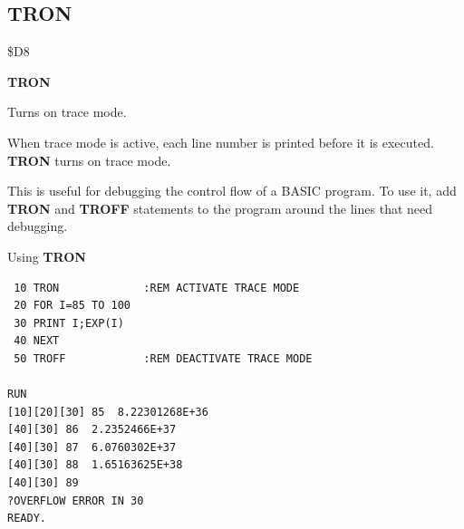 \subsection{TRON}
\begin{description}[leftmargin=2cm,style=nextline]
\item [Token:] \$D8
\item [Format:] {\bf TRON}
\item [Usage:]  Turns on trace mode.

                When trace mode is active, each line number is printed before
                it is executed. {\bf TRON} turns on trace mode.

                This is useful for debugging the control flow of a BASIC
                program. To use it, add {\bf TRON} and {\bf TROFF} statements
                to the program around the lines that need debugging.

\item [Example:] Using {\bf TRON}
\begin{tcolorbox}[colback=black,coltext=white]
\verbatimfont{\codefont}
\begin{verbatim}
 10 TRON             :REM ACTIVATE TRACE MODE
 20 FOR I=85 TO 100
 30 PRINT I;EXP(I)
 40 NEXT
 50 TROFF            :REM DEACTIVATE TRACE MODE

RUN
[10][20][30] 85  8.22301268E+36
[40][30] 86  2.2352466E+37
[40][30] 87  6.0760302E+37
[40][30] 88  1.65163625E+38
[40][30] 89
?OVERFLOW ERROR IN 30
READY.
\end{verbatim}
\end{tcolorbox}
\end{description}


\newpage
